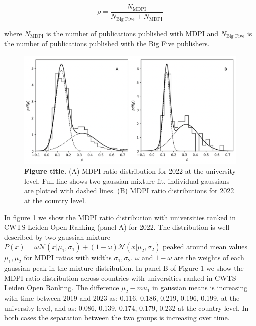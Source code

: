 \documentclass[amsfonts, amssymb, prl, superscriptaddress, notitlepage, twocolumn, nofootinbib]{revtex4-2}
\begin{document}
\begin{equation}
\rho = \frac{N_{\text{MDPI}}}{N_{\text{Big Five}}+N_{\text{MDPI}}}
\end{equation}

where $N_{\text{MDPI}}$ is the number of publications published with MDPI and $N_{\text{Big Five}}$ is the number of publications published with the Big Five publishers.

\begin{figure}
\centering
\includegraphics[width=1.0\linewidth]{Fig01f.png}
\caption{\label{fig:fig1} {\bf Figure title.} (A) MDPI ratio distribution for 2022 at the university level, Full line shows two-gaussian mixture fit, individual gaussians are plotted with dashed lines. (B) MDPI ratio distributions for 2022 at the country level.
}
\end{figure}

In figure 1 we show the MDPI ratio distribution with universities ranked in CWTS Leiden Open Ranking (panel A) for 2022. The distribution is well described by two-gaussian mixture $P(x) = \omega\mathcal{N}(x|\mu_1, \sigma_1) + (1-\omega)\mathcal{N}(x|\mu_2, \sigma_2)$ peaked around mean values $\mu_1, \mu_2$ for MDPI ratios with widths $\sigma_1, \sigma_2$. $\omega$ and $1-\omega$ are the weights of each gaussian peak in the mixture distribution. In panel B of Figure 1 we show the MDPI ratio distribution across countries with universities ranked in CWTS Leiden Open Ranking. The difference $\mu_2-mu_1$ in gaussian means is increasing with time between 2019 and 2023 as: 0.116, 0.186, 0.219, 0.196, 0.199, at the university level, and as: 0.086, 0.139, 0.174, 0.179, 0.232 at the country level. In both cases the separation between the two groups is increasing over time. 
\end{document}
